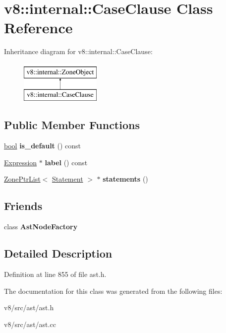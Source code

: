 \hypertarget{classv8_1_1internal_1_1CaseClause}{}\section{v8\+:\+:internal\+:\+:Case\+Clause Class Reference}
\label{classv8_1_1internal_1_1CaseClause}
Inheritance diagram for v8\+:\+:internal\+:\+:Case\+Clause\+:\begin{figure}[H]
\begin{center}
\leavevmode
\includegraphics[height=2.000000cm]{classv8_1_1internal_1_1CaseClause}
\end{center}
\end{figure}
\subsection*{Public Member Functions}
\begin{DoxyCompactItemize}
\item 
\mbox{\label{classv8_1_1internal_1_1CaseClause_af1a16277bc389b40aaeda6c4cb258b28}} 
\mbox{\hyperlink{classbool}{bool}} {\bfseries is\+\_\+default} () const
\item 
\mbox{\label{classv8_1_1internal_1_1CaseClause_acf2c189579a739c35673fe4dd22b988b}} 
\mbox{\hyperlink{classv8_1_1internal_1_1Expression}{Expression}} $\ast$ {\bfseries label} () const
\item 
\mbox{\label{classv8_1_1internal_1_1CaseClause_adc222ee512b2432e63889542410c7916}} 
\mbox{\hyperlink{classv8_1_1internal_1_1ZoneList}{Zone\+Ptr\+List}}$<$ \mbox{\hyperlink{classv8_1_1internal_1_1Statement}{Statement}} $>$ $\ast$ {\bfseries statements} ()
\end{DoxyCompactItemize}
\subsection*{Friends}
\begin{DoxyCompactItemize}
\item 
\mbox{\label{classv8_1_1internal_1_1CaseClause_a8d587c8ad3515ff6433eb83c578e795f}} 
class {\bfseries Ast\+Node\+Factory}
\end{DoxyCompactItemize}


\subsection{Detailed Description}


Definition at line 855 of file ast.\+h.



The documentation for this class was generated from the following files\+:\begin{DoxyCompactItemize}
\item 
v8/src/ast/ast.\+h\item 
v8/src/ast/ast.\+cc\end{DoxyCompactItemize}
